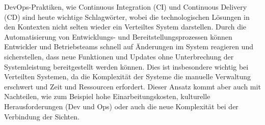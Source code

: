 DevOps-Praktiken, wie Continuous Integration (CI) und Continuous Delivery (CD) sind heute wichtige Schlagwörter, wobei die technologischen Lösungen in den Kontexten nicht selten wieder ein Verteiltes System darstellen. Durch die Automatisierung von Entwicklungs- und Bereitstellungsprozessen können Entwickler und Betriebsteams schnell auf Änderungen im System reagieren und sicherstellen, dass neue Funktionen und Updates ohne Unterbrechung der Systemleistung bereitgestellt werden können. Dies ist insbesondere wichtig bei Verteilten Systemen, da die Komplexität der Systeme die manuelle Verwaltung erschwert und Zeit und Ressourcen erfordert. Dieser Ansatz kommt aber auch mit Nachteilen, wie zum Beispiel hohe Einarbeitungskosten, kulturelle Herausforderungen (Dev und Ops) oder auch die neue Komplexität bei der Verbindung der Sichten.

